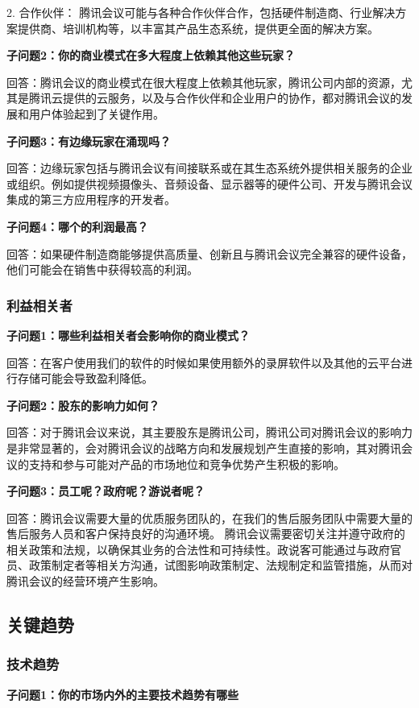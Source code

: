 \documentclass[a4paper,12pt]{article}
\begin{document}
    2. 合作伙伴： 腾讯会议可能与各种合作伙伴合作，包括硬件制造商、行业解决方案提供商、培训机构等，以丰富其产品生态系统，提供更全面的解决方案。

    \textbf{子问题2：你的商业模式在多大程度上依赖其他这些玩家？}

    回答：腾讯会议的商业模式在很大程度上依赖其他玩家，腾讯公司内部的资源，尤其是腾讯云提供的云服务，以及与合作伙伴和企业用户的协作，都对腾讯会议的发展和用户体验起到了关键作用。

    \textbf{子问题3：有边缘玩家在涌现吗？}

    回答：边缘玩家包括与腾讯会议有间接联系或在其生态系统外提供相关服务的企业或组织。例如提供视频摄像头、音频设备、显示器等的硬件公司、开发与腾讯会议集成的第三方应用程序的开发者。

    \textbf{子问题4：哪个的利润最高？}

    回答：如果硬件制造商能够提供高质量、创新且与腾讯会议完全兼容的硬件设备，他们可能会在销售中获得较高的利润。
    
    \subsubsection{利益相关者}
    \textbf{子问题1：哪些利益相关者会影响你的商业模式？}
    
    回答：在客户使⽤我们的软件的时候如果使⽤额外的录屏软件以及其他的云平台进⾏存储可能会导致盈利降低。

    \textbf{子问题2：股东的影响力如何？}

    回答：对于腾讯会议来说，其主要股东是腾讯公司，腾讯公司对腾讯会议的影响力是非常显著的，会对腾讯会议的战略方向和发展规划产生直接的影响，其对腾讯会议的支持和参与可能对产品的市场地位和竞争优势产生积极的影响。


    \textbf{子问题3：员工呢？政府呢？游说者呢？}

    回答：腾讯会议需要⼤量的优质服务团队的，在我们的售后服务团队中需要⼤量的售后服务⼈员和客户保持良好的沟通环境。
    腾讯会议需要密切关注并遵守政府的相关政策和法规，以确保其业务的合法性和可持续性。政说客可能通过与政府官员、政策制定者等相关方沟通，试图影响政策制定、法规制定和监管措施，从而对腾讯会议的经营环境产生影响。
    
    \subsection{关键趋势}
    \subsubsection{技术趋势}
    \textbf{子问题1：你的市场内外的主要技术趋势有哪些}
\end{document}
